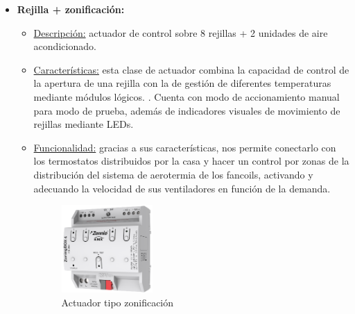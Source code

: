 \begin{itemize}
\item \textbf{Rejilla + zonificación:} 
	\begin{itemize}
	\item\underline{Descripción:} actuador de control sobre 8 rejillas + 2 unidades de aire acondicionado.
	\item \underline{Características:} esta clase de actuador combina la capacidad de control de la apertura de una rejilla con la de gestión de diferentes temperaturas mediante módulos lógicos. . Cuenta con modo de accionamiento manual para modo de prueba, además de indicadores visuales de movimiento de rejillas mediante LEDs.
	\item \underline{Funcionalidad:} gracias a sus características, nos permite conectarlo con los termostatos distribuidos por la casa y hacer un control por zonas de la distribución del sistema de aerotermia de los fancoils, activando y adecuando la velocidad de sus ventiladores en función de la demanda.
	\begin{figure}[H]
	\centering
	\includegraphics[width=0.35\textwidth]{figures/actuador_rejilla.png}   
	\caption{Actuador tipo zonificación}
	\label{fig:actuador_rejilla}
	\end{figure}
	\end{itemize} 


\end{itemize}
